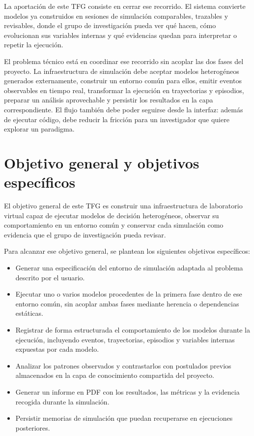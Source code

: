 La aportación de este TFG consiste en cerrar ese recorrido. El sistema
convierte modelos ya construidos en sesiones de simulación comparables,
trazables y revisables, donde el grupo de investigación pueda ver qué
hacen, cómo evolucionan sus variables internas y qué evidencias quedan
para interpretar o repetir la ejecución.

El problema técnico está en coordinar ese recorrido sin acoplar las dos
fases del proyecto. La infraestructura de simulación debe aceptar modelos
heterogéneos generados externamente, construir un entorno común para ellos,
emitir eventos observables en tiempo real, transformar la ejecución en
trayectorias y episodios, preparar un análisis aprovechable y persistir los
resultados en la capa correspondiente. El flujo también debe poder
seguirse desde la interfaz: además de ejecutar código, debe reducir la fricción
para un investigador que quiere explorar un paradigma.

\section{Objetivo general y objetivos específicos}

El objetivo general de este TFG es construir una infraestructura de
laboratorio virtual capaz de ejecutar modelos de decisión heterogéneos,
observar su comportamiento en un entorno común y conservar cada simulación como
evidencia que el grupo de investigación pueda revisar.

Para alcanzar ese objetivo general, se plantean los siguientes objetivos
específicos:

\begin{itemize}
\item Generar una especificación del entorno de simulación adaptada al problema
descrito por el usuario.
\item Ejecutar uno o varios modelos procedentes de la primera fase dentro de
ese entorno común, sin acoplar ambas fases mediante herencia o dependencias
estáticas.
\item Registrar de forma estructurada el comportamiento de los modelos durante
la ejecución, incluyendo eventos, trayectorias, episodios y variables internas
expuestas por cada modelo.
\item Analizar los patrones observados y contrastarlos con postulados previos
almacenados en la capa de conocimiento compartida del proyecto.
\item Generar un informe en PDF con los resultados, las métricas y la evidencia
recogida durante la simulación.
\item Persistir memorias de simulación que puedan recuperarse en ejecuciones
posteriores.
\end{itemize}

